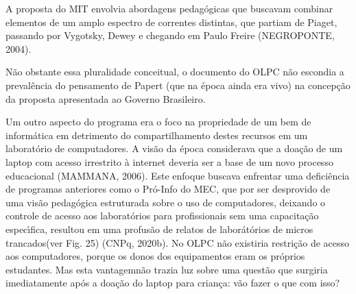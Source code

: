 \documentclass[
12pt,		%
openright,	%
twoside,  %
a4paper,			%
chapter=TITLE,		%
english,			%
french,				%
spanish,			%
brazil				%
]{USPSC-classe/USPSC}
\begin{document}
A proposta do MIT envolvia abordagens pedag\'ogicas que buscavam combinar elementos de um amplo espectro de correntes distintas, que partiam de Piaget, passando por Vygotsky, Dewey e chegando em Paulo Freire  (NEGROPONTE, 2004).








N\~ao obstante essa pluralidade conceitual, o documento do OLPC n\~ao escondia a preval\^encia do pensamento de Papert (que na \'epoca ainda era vivo) na concep\c{c}\~ao da proposta apresentada ao Governo Brasileiro.









\noindent\begin{center}\mbox{\centering{}}\end{center}


Um outro aspecto do programa era o foco na \textquotedbl propriedade de um bem de inform\'atica em detrimento do compartilhamento destes recursos em um laborat\'orio de computadores\textquotedbl . A vis\~ao da \'epoca considerava que a doa\c{c}\~ao de um laptop com acesso irrestrito \`a internet deveria ser a base de um novo processo educacional  (MAMMANA, 2006). Este enfoque buscava enfrentar uma defici\^encia de programas anteriores como o Pr\'o-Info do MEC, que por ser desprovido de uma vis\~ao pedag\'ogica estruturada sobre o uso de computadores, deixando o controle de acesso aos laborat\'orios para profissionais sem uma capacita\c{c}\~ao espec\'{\i}fica, resultou em uma profus\~ao de relatos de \textquotedbl labor\'at\'orios de micros trancados\textquotedbl  (ver Fig. 25)  (CNPq, 2020b). No OLPC n\~ao existiria restri\c{c}\~ao de acesso aos computadores, porque os donos dos equipamentos eram os pr\'oprios estudantes. Mas esta \textquotedbl vantagem\textquotedbl  n\~ao trazia luz sobre  uma quest\~ao que surgiria imediatamente ap\'os a doa\c{c}\~ao do laptop para crian\c{c}a: v\~ao fazer o que com isso?
\end{document}
